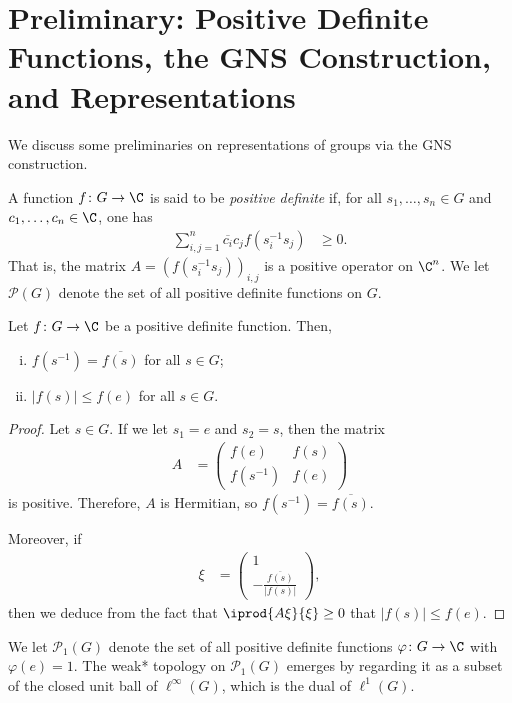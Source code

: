 \documentclass[10pt]{mypackage}
\begin{document}
\RaggedRight
\section{Preliminary: Positive Definite Functions, the GNS Construction, and Representations}%
We discuss some preliminaries on representations of groups via the GNS construction.
\begin{definition}
  A function $f\colon G\rightarrow \C$ is said to be \textit{positive definite} if, for all $s_1,\dots,s_n\in G$ and $c_1,\dots,c_n\in \C$, one has
  \begin{align*}
    \sum_{i,j=1}^{n} \overline{c_i}c_j f\left( s_i^{-1}s_j \right) &\geq 0.
  \end{align*}
  That is, the matrix $A = \left( f\left( s_i^{-1}s_j \right) \right)_{i,j}$ is a positive operator on $\C^n$. We let $\mathcal{P}(G)$ denote the set of all positive definite functions on $G$.
\end{definition}
\begin{proposition}
  Let $f\colon G\rightarrow \C$ be a positive definite function. Then,
  \begin{enumerate}[(i)]
    \item $f\left( s^{-1} \right) = \overline{f(s)}$ for all $s\in G$;
    \item $ \left\vert f\left( s \right) \right\vert\leq f\left( e \right) $ for all $s\in G$.
  \end{enumerate}
\end{proposition}
\begin{proof}
  Let $s\in G$. If we let $s_1 = e$ and $s_2 = s$, then the matrix
  \begin{align*}
    A &= \begin{pmatrix}f(e) & f(s) \\ f\left( s^{-1} \right) & f\left( e \right)\end{pmatrix}
  \end{align*}
  is positive. Therefore, $A$ is Hermitian, so $ f\left( s^{-1} \right) = \overline{f\left( s \right)} $.

  Moreover, if
  \begin{align*}
    \xi &= \begin{pmatrix}1\\ -\frac{ \overline{f\left( s \right)} }{\left\vert f\left( s \right) \right\vert}\end{pmatrix},
  \end{align*}
  then we deduce from the fact that $ \iprod{A\xi}{\xi} \geq 0$ that $\left\vert f\left( s \right) \right\vert\leq f\left( e \right)$.
\end{proof}
We let $\mathcal{P}_1(G)$ denote the set of all positive definite functions $\varphi\colon G\rightarrow \C$ with $\varphi\left( e \right) = 1$. The weak* topology on $\mathcal{P}_1\left( G \right)$ emerges by regarding it as a subset of the closed unit ball of $\ell^{\infty}\left( G \right)$, which is the dual of $\ell^1\left( G \right)$.
\end{document}
